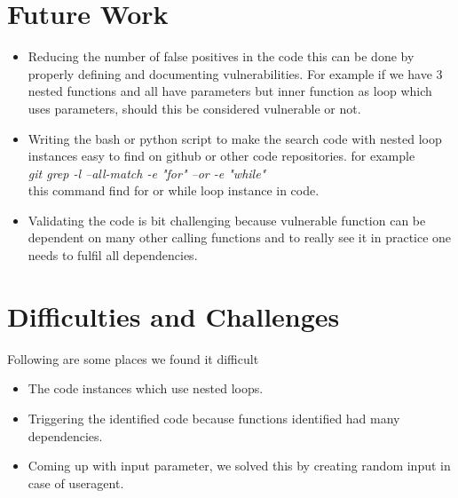 \documentclass[authoryear,preprint]{sigplanconf}
\begin{document}
\section{Future Work}
\begin{itemize}
\item Reducing the number of false positives in the code this can be done by properly defining and documenting vulnerabilities. For example if we have 3 nested functions and all have parameters but inner function as loop which uses parameters, should this be considered vulnerable or not.
\item Writing the bash or python script to make the search code with nested loop instances easy to find on github or other code repositories.
for example \\
 \textit{git grep -l --all-match -e "for" --or -e "while"} \\
this command find for or while loop instance in code.
\item Validating the code is bit challenging because vulnerable function can be dependent on many other calling functions and to really see it in practice one needs to fulfil all dependencies.


\end{itemize}

\section{Difficulties and Challenges}

Following are some places we found it difficult
\begin{itemize}
\item The code instances which use nested loops.
\item Triggering the identified code because functions identified had many dependencies.
\item Coming up with input parameter, we solved this by creating random input in case of useragent.
\end{itemize}

\citep{Aho86-Compilers}

\end{document}
